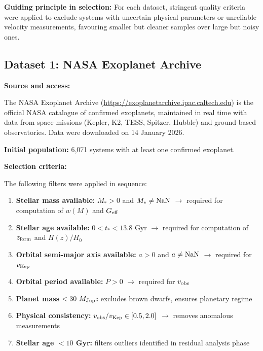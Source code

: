 \documentclass[10pt,a4paper]{article}
\providecommand{\tightlist}{\setlength{\itemsep}{0pt}\setlength{\parskip}{0pt}}
\begin{document}
\textbf{Guiding principle in selection:} For each dataset, stringent
quality criteria were applied to exclude systems with uncertain physical
parameters or unreliable velocity measurements, favouring smaller but
cleaner samples over large but noisy ones.

\subsection{Dataset 1: NASA Exoplanet
Archive}\label{dataset-1-nasa-exoplanet-archive}

\textbf{Source and access:}

The NASA Exoplanet Archive (\url{https://exoplanetarchive.ipac.caltech.edu})
is the official NASA catalogue of confirmed exoplanets, maintained in
real time with data from space missions (Kepler, K2, TESS, Spitzer,
Hubble) and ground-based observatories. Data were downloaded on 14
January 2026.

\textbf{Initial population:} 6,071 systems with at least one confirmed
exoplanet.

\textbf{Selection criteria:}

The following filters were applied in sequence:

\begin{enumerate}
\def\labelenumi{\arabic{enumi}.}
\tightlist
\item
  \textbf{Stellar mass available:} \(M_* > 0\) and
  \(M_* \neq {\rm NaN}\) $\rightarrow$ required for computation of \(w(M)\) and
  \(G_{\rm eff}\)
\item
  \textbf{Stellar age available:} \(0 < t_* < 13.8\) Gyr $\rightarrow$ required for
  computation of \(z_{\rm form}\) and \(H(z)/H_0\)
\item
  \textbf{Orbital semi-major axis available:} \(a > 0\) and
  \(a \neq {\rm NaN}\) $\rightarrow$ required for \(v_{\rm Kep}\)
\item
  \textbf{Orbital period available:} \(P > 0\) $\rightarrow$ required for
  \(v_{\rm obs}\)
\item
  \textbf{Planet mass \(< 30~M_{\rm Jup}\):} excludes brown dwarfs,
  ensures planetary regime
\item
  \textbf{Physical consistency:}
  \(v_{\rm obs}/v_{\rm Kep} \in [0.5, 2.0]\) $\rightarrow$ removes anomalous
  measurements
\item
  \textbf{Stellar age \(< 10\) Gyr:} filters outliers identified in
  residual analysis phase
\end{enumerate}
\end{document}
